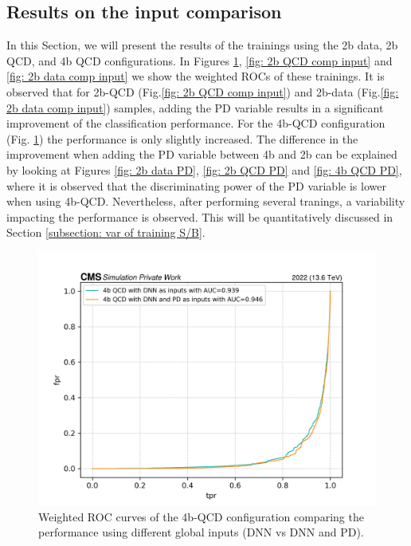 \subsection{Results on the input comparison} \label{subsection: results on the trainings}


In this Section, we will present the results of the trainings using the 2b data, 2b QCD, and 4b QCD configurations. In Figures \ref{fig: 4b QCD comp input}, \ref{fig: 2b QCD comp input} and \ref{fig: 2b data comp input} we show the weighted ROCs of these trainings. It is observed that for 2b-QCD (Fig.\ref{fig: 2b QCD comp input}) and 2b-data (Fig.\ref{fig: 2b data comp input}) samples, adding the PD variable results in a significant improvement of the classification performance. For the 4b-QCD configuration (Fig. \ref{fig: 4b QCD comp input})  the performance is only slightly increased.  The difference in the improvement when adding the PD variable between 4b and 2b can be explained by looking at Figures \ref{fig: 2b data PD}, \ref{fig: 2b QCD PD} and \ref{fig: 4b QCD PD}, where it is observed that the discriminating power of the PD variable is lower when using 4b-QCD. Nevertheless, after performing several tranings, a variability impacting the performance is observed. This will be quantitatively discussed in Section \ref{subsection: var of training S/B}.


\begin{figure}[hbt]
    \centering
    \includegraphics[width=0.7\linewidth]{Images/7.S:B/Inputs/4b QCD bis.png}
    \caption{Weighted ROC curves of the 4b-QCD configuration comparing the performance using different global inputs (DNN vs DNN and PD).}
    \label{fig: 4b QCD comp input}
\end{figure}

